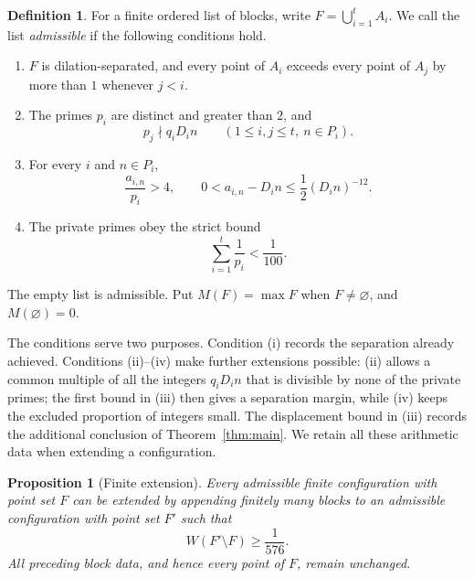\documentclass[11pt,reqno]{amsart}
\newtheorem{proposition}[theorem]{Proposition}
\theoremstyle{definition}
\newtheorem{definition}[theorem]{Definition}
\theoremstyle{remark}
\numberwithin{equation}{section}
\begin{document}
\begin{definition}\label{def:admissible}
For a finite ordered list of blocks, write $F=\bigcup_{i=1}^t A_i$.
We call the list \emph{admissible} if the following conditions hold.
\begin{enumerate}
\item[(i)] $F$ is dilation-separated, and every point of $A_i$ exceeds
every point of $A_j$ by more than $1$ whenever $j<i$.
\item[(ii)] The primes $p_i$ are distinct and greater than $2$, and
\begin{equation}\label{eq:private-invariant}
 p_j\nmid q_iD_i n
 \qquad(1\leq i,j\leq t,\ n\in P_i).
\end{equation}
\item[(iii)] For every $i$ and $n\in P_i$,
\begin{equation}\label{eq:block-size}
 \frac{a_{i,n}}{p_i}>4,
 \qquad
 0<a_{i,n}-D_i n\leq\frac12(D_i n)^{-12}.
\end{equation}
\item[(iv)] The private primes obey the strict bound
\begin{equation}\label{eq:reciprocal-primes}
 \sum_{i=1}^t\frac1{p_i}<\frac1{100}.
\end{equation}
\end{enumerate}
The empty list is admissible. Put $M(F)=\max F$ when $F\ne\varnothing$,
and $M(\varnothing)=0$.
\end{definition}

The conditions serve two purposes. Condition (i) records the separation
already achieved. Conditions (ii)--(iv) make further extensions possible:
(ii) allows a common multiple of all the integers $q_iD_i n$ that is
divisible by none of the private primes; the first bound in (iii) then
gives a separation margin, while (iv) keeps the excluded proportion of
integers small. The displacement bound in (iii) records the additional
conclusion of Theorem~\ref{thm:main}. We retain all these arithmetic data
when extending a configuration.

\begin{proposition}[Finite extension]\label{prop:finite-extension}
Every admissible finite configuration with point set $F$ can be extended
by appending finitely many blocks to an admissible configuration with
point set $F'$ such that
\[
 W(F'\setminus F)\geq\frac1{576}.
\]
All preceding block data, and hence every point of $F$, remain unchanged.
\end{proposition}
\end{document}
